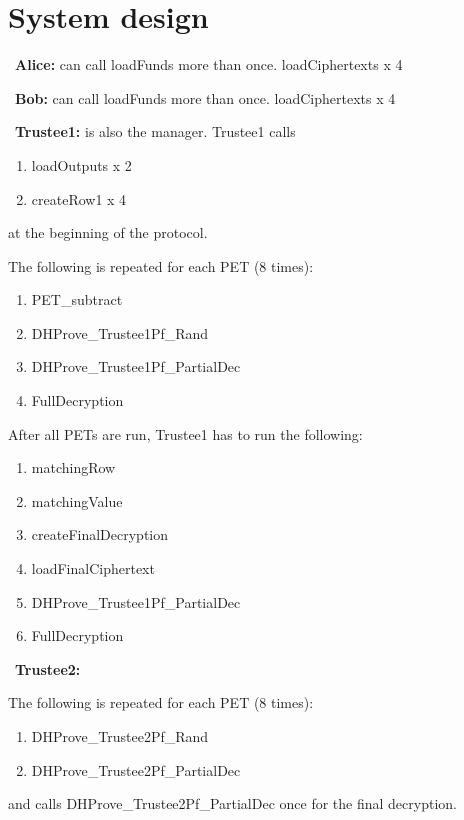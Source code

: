 \section{System design}
\label{sec:system}

~\textbf{Alice:} can call loadFunds more than once. loadCiphertexts  x 4

~\textbf{Bob:} can call loadFunds more than once. loadCiphertexts x 4

~\textbf{Trustee1:} is also the manager. Trustee1 calls  
\begin{enumerate}
	\item loadOutputs  x 2
	\item  createRow1  x 4
\end{enumerate}
at the beginning of the protocol. 
\newline

The following is repeated for each PET (8 times): 
\begin{enumerate}
	\item PET\_subtract
	\item DHProve\_Trustee1Pf\_Rand
	\item DHProve\_Trustee1Pf\_PartialDec
	 \item FullDecryption
\end{enumerate}

After all PETs are run, Trustee1 has to run the following:
\begin{enumerate}
	\item matchingRow
	\item matchingValue
	\item createFinalDecryption
	\item loadFinalCiphertext
	\item DHProve\_Trustee1Pf\_PartialDec
	\item FullDecryption
\end{enumerate}

~\textbf{Trustee2:} 

The following is repeated for each PET (8 times): 
\begin{enumerate}
	\item DHProve\_Trustee2Pf\_Rand 
	\item DHProve\_Trustee2Pf\_PartialDec
\end{enumerate}
and calls DHProve\_Trustee2Pf\_PartialDec once for the final decryption.


